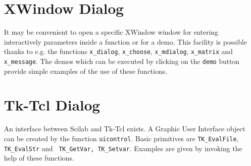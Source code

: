 \section{XWindow Dialog}
It may be convenient to open a specific XWindow window for entering
interactively parameters inside a function or for a demo.
This facility is possible thanks to e.g. the functions \verb!x_dialog!,
\verb!x_choose!, \verb!x_mdialog!, \verb!x_matrix! and \verb!x_message!.
The demos which can be executed by clicking on the {\tt demo} button
provide simple examples of the use of these functions.

\section{Tk-Tcl Dialog}
An interface between Scilab and Tk-Tcl exists. 
A Graphic User Interface object can be created by the function
\verb!uicontrol!. Basic primitives are \verb!TK_EvalFile!,
\verb!TK_EvalStr! and \verb! TK_GetVar, TK_Setvar!. Examples
are given by invoking the help of these functions.

